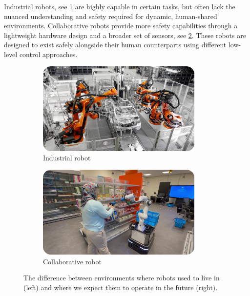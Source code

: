 Industrial robots, see \cref{fig:industrial_robot}
are highly capable in certain tasks, but
often lack the nuanced understanding and safety required for
dynamic, human-shared environments. Collaborative robots
provide more safety capabilities through a lightweight
hardware design and a broader set of sensors, see
\cref{fig:collaborative_robot}. These
robots are designed to exist safely alongside their human
counterparts using different low-level control approaches.

\begin{figure}
  \centering
  \begin{subfigure}{0.5\textwidth}
    \centering
    \includegraphics[width=0.9\textwidth]{src/introduction/img/industrial_robot.png}
    \caption{Industrial robot}
    \label{fig:industrial_robot}
  \end{subfigure}%
  \begin{subfigure}{0.5\textwidth}
    \centering
    \includegraphics[width=0.9\textwidth]{src/introduction/img/collaborative_robot.png}
    \caption{Collaborative robot}
    \label{fig:collaborative_robot}
  \end{subfigure}
  \caption{The difference between environments where robots
  used to live in (left) and where we expect them to operate
  in the future (right).}
  \label{fig:different_robots}
\end{figure}


